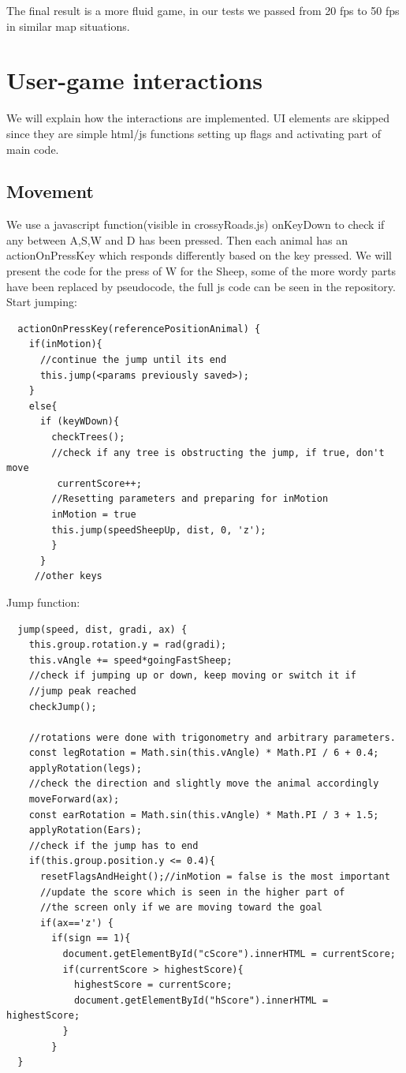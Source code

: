 \documentclass[a4paper, 11pt]{article}
\begin{document}
The final result is a more fluid game, in our tests we passed from 20 fps to 50 fps in similar map situations. 


\section{User-game interactions}
We will explain how the interactions are implemented. UI elements are skipped since they are simple html/js functions setting up flags and activating part of main code.
\subsection{Movement}
We use a javascript function(visible in crossyRoads.js) onKeyDown to check if any between A,S,W and D has been pressed. Then each animal has an actionOnPressKey which responds differently based on the key pressed. We will present the code for the press of W for the Sheep, some of the more wordy parts have been replaced by pseudocode, the full js code can be seen in the repository.
Start jumping:\\
\begin{lstlisting}
  actionOnPressKey(referencePositionAnimal) {
    if(inMotion){
      //continue the jump until its end
      this.jump(<params previously saved>);
    }
    else{
      if (keyWDown){
        checkTrees();
        //check if any tree is obstructing the jump, if true, don't move
         currentScore++;
        //Resetting parameters and preparing for inMotion
        inMotion = true
        this.jump(speedSheepUp, dist, 0, 'z');
        }
      }
     //other keys
\end{lstlisting}
Jump function:
\begin{lstlisting}
  jump(speed, dist, gradi, ax) {
    this.group.rotation.y = rad(gradi);
    this.vAngle += speed*goingFastSheep;
    //check if jumping up or down, keep moving or switch it if
    //jump peak reached
    checkJump();
	
    //rotations were done with trigonometry and arbitrary parameters.
    const legRotation = Math.sin(this.vAngle) * Math.PI / 6 + 0.4;
    applyRotation(legs);
    //check the direction and slightly move the animal accordingly
    moveForward(ax);
    const earRotation = Math.sin(this.vAngle) * Math.PI / 3 + 1.5;
    applyRotation(Ears);
    //check if the jump has to end
    if(this.group.position.y <= 0.4){
	  resetFlagsAndHeight();//inMotion = false is the most important
	  //update the score which is seen in the higher part of 
	  //the screen only if we are moving toward the goal
      if(ax=='z') {
        if(sign == 1){
          document.getElementById("cScore").innerHTML = currentScore;
          if(currentScore > highestScore){
            highestScore = currentScore;
            document.getElementById("hScore").innerHTML = highestScore;
          }
        }
  }
\end{lstlisting}
\end{document}
